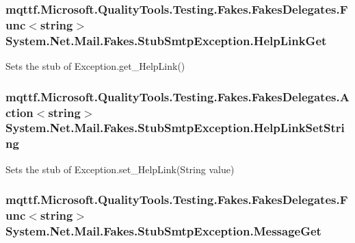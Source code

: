 \hypertarget{class_system_1_1_net_1_1_mail_1_1_fakes_1_1_stub_smtp_exception_ace9fc4cb5fbb24edbe2b7078a4298974}{
\subsubsection[{Help\-Link\-Get}]{\setlength{\rightskip}{0pt plus 5cm}mqttf.\-Microsoft.\-Quality\-Tools.\-Testing.\-Fakes.\-Fakes\-Delegates.\-Func$<$string$>$ System.\-Net.\-Mail.\-Fakes.\-Stub\-Smtp\-Exception.\-Help\-Link\-Get}}\label{class_system_1_1_net_1_1_mail_1_1_fakes_1_1_stub_smtp_exception_ace9fc4cb5fbb24edbe2b7078a4298974}


Sets the stub of Exception.\-get\-\_\-\-Help\-Link()

\hypertarget{class_system_1_1_net_1_1_mail_1_1_fakes_1_1_stub_smtp_exception_a2fc6bcf4d04184e9f3217fedff57f87b}{
\subsubsection[{Help\-Link\-Set\-String}]{\setlength{\rightskip}{0pt plus 5cm}mqttf.\-Microsoft.\-Quality\-Tools.\-Testing.\-Fakes.\-Fakes\-Delegates.\-Action$<$string$>$ System.\-Net.\-Mail.\-Fakes.\-Stub\-Smtp\-Exception.\-Help\-Link\-Set\-String}}\label{class_system_1_1_net_1_1_mail_1_1_fakes_1_1_stub_smtp_exception_a2fc6bcf4d04184e9f3217fedff57f87b}


Sets the stub of Exception.\-set\-\_\-\-Help\-Link(\-String value)

\hypertarget{class_system_1_1_net_1_1_mail_1_1_fakes_1_1_stub_smtp_exception_a4f49950e369f393191f8f053996c631b}{
\subsubsection[{Message\-Get}]{\setlength{\rightskip}{0pt plus 5cm}mqttf.\-Microsoft.\-Quality\-Tools.\-Testing.\-Fakes.\-Fakes\-Delegates.\-Func$<$string$>$ System.\-Net.\-Mail.\-Fakes.\-Stub\-Smtp\-Exception.\-Message\-Get}}\label{class_system_1_1_net_1_1_mail_1_1_fakes_1_1_stub_smtp_exception_a4f49950e369f393191f8f053996c631b}



